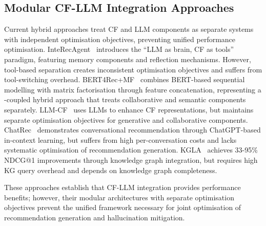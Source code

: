 \documentclass[acmsmall]{acmart}
\begin{document}
\subsection{Modular CF-LLM Integration Approaches}
Current hybrid approaches treat CF and LLM components as separate systems with independent optimisation objectives, preventing unified performance optimisation. InteRecAgent~\cite{liu2023interecagent} introduces the ``LLM as brain, CF as tools'' paradigm, featuring memory components and reflection mechanisms. However, tool-based separation creates inconsistent optimisation objectives and suffers from tool-switching overhead. %
BERT4Rec+MF~\cite{sun2021bert4rec} combines BERT-based sequential modelling with matrix factorisation through feature concatenation, representing a \loosely-coupled hybrid approach that treats collaborative and semantic components separately. LLM-CF~\cite{wu2024llm} uses LLMs to enhance CF representations, but maintains separate optimisation objectives for generative and collaborative components. ChatRec~\cite{gao2023chat} demonstrates conversational recommendation through ChatGPT-based in-context learning, but suffers from high per-conversation costs and lacks systematic optimisation of recommendation generation. KGLA~\cite{kgla2024} achieves 33-95\% NDCG@1 improvements through knowledge graph integration, but requires high KG query overhead and depends on knowledge graph completeness.

These approaches establish that CF-LLM integration provides performance benefits; however, their modular architectures with separate optimisation objectives prevent the unified framework necessary for joint optimisation of recommendation generation and hallucination mitigation.



\end{document}
